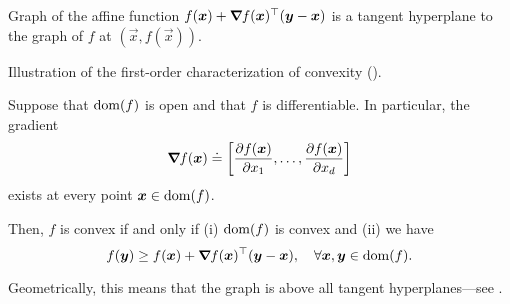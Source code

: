 \begin{marginfigure}[-6cm]
    \centering
    \caption{Graph of the affine function $f(\bm{x}) + \bm{\nabla}_{\! } f(\bm{x})^\top(\bm{y}-\bm{x})$ is a tangent hyperplane to the graph of $f$ at $(\vec{x},f(\vec{x}))$.}
    \label{fig:differentiable-function}
\end{marginfigure}

\begin{marginfigure}
    \centering
    \caption{Illustration of the first-order characterization of convexity ().}
    \label{fig:first-order-convexity}
\end{marginfigure}

\begin{lemma} \label{lem:first-order-convexity}
    Suppose that $\mathrm{dom}(f)$ is open and that $f$ is differentiable. In particular, the gradient \[
        \grad{f(\vec{x})}{} \doteq \lft[ \pdv{f(\vec{x})}{x_1}, \ldots, \pdv{f(\vec{x})}{x_d} \rgt]
    \]
    exists at every point $\bm{x}\in\mathrm{dom}(f)$.

    Then, $f$ is convex if and only if (i) $\mathrm{dom}(f)$ is convex and (ii) we have \[
        f(\bm{y}) \geq f(\bm{x}) + \bm{\nabla}_{\! } f(\bm{x})^\top (\bm{y}-\bm{x}), \quad \forall \bm{x}, \bm{y} \in \mathrm{dom}(f).
    \]
\end{lemma}

Geometrically, this means that the graph is above all tangent hyperplanes---see
.

